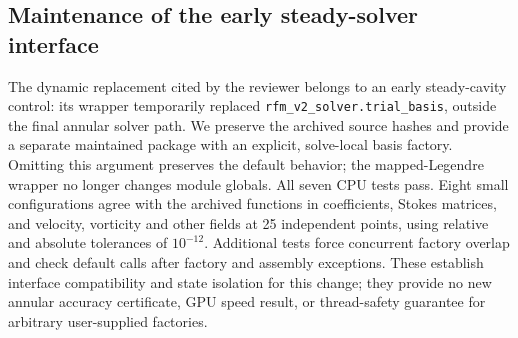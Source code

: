 \subsection{Maintenance of the early steady-solver interface}
The dynamic replacement cited by the reviewer belongs to an early steady-cavity
control: its wrapper temporarily replaced
\texttt{rfm\_v2\_solver.trial\_basis}, outside the final annular solver path.
We preserve the archived source hashes and provide a separate maintained package
with an explicit, solve-local basis factory. Omitting this argument preserves the
default behavior; the mapped-Legendre wrapper no longer changes module globals.
All seven CPU tests pass. Eight small configurations agree with the archived
functions in coefficients, Stokes matrices, and velocity, vorticity and other fields
at 25 independent points, using relative and absolute tolerances of $10^{-12}$.
Additional tests force concurrent factory overlap and check default calls after
factory and assembly exceptions. These establish interface compatibility and
state isolation for this change; they provide no new annular accuracy certificate,
GPU speed result, or thread-safety guarantee for arbitrary user-supplied factories.
